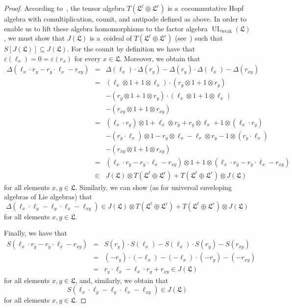 \documentclass{jonasart}
\DeclareMathOperator{\UL}{UL}
\DeclareMathOperator{\weak}{weak}
\newcommand{\lf}{\mathfrak{L}}
\begin{document}
	\begin{proof}
		According to~\cite[Theorem III.2.4 and Example 3 on p.\ 56]{K}, the tensor algebra $T(\lf^\ell\oplus\lf^r )$ is a~cocommutative Hopf algebra with comultiplication, counit, and antipode defined as above. In order to enable us to lift these algebra homomorphisms to the factor algebra
		$\UL_{\weak}(\lf)$, we must show that $J(\lf)$ is a~coideal of $T(\lf^\ell
		\oplus\lf^r )$ (see~\cite[Definition~III.1.5]{K}) such that $S[J(\lf)]
		\subseteq J(\lf)$. For the counit by definition we have that $\varepsilon
		(\ell_x )=0=\varepsilon(r_x )$ for every $x\in\lf$. Moreover, we obtain that
		\begin{eqnarray*}
			\Delta(\ell_x\cdot r_y -r_y\cdot\ell_x -r_{xy}) & = & \Delta(\ell_x )\cdot
			\Delta(r_y )-\Delta(r_y )\cdot\Delta(\ell_x )-\Delta(r_{xy})\\
			& = & (\ell_x\otimes 1+1\otimes\ell_x )\cdot(r_y\otimes 1+1\otimes r_y )\\
			&& -(r_y\otimes 1+1\otimes r_y )\cdot(\ell_x\otimes 1+1\otimes\ell_x )\\
			&& -(r_{xy}\otimes 1+1\otimes r_{xy})\\
			& = & (\ell_x\cdot r_y )\otimes 1+\ell_x\otimes r_y +r_y\otimes\ell_x
			+1\otimes(\ell_x\cdot r_y )\\
			&& -(r_y\cdot\ell_x )\otimes 1-r_y\otimes\ell_x -\ell_x\otimes r_y -1
			\otimes(r_y\cdot\ell_x )\\
			&& -(r_{xy}\otimes 1+1\otimes r_{xy})\\
			& = & (\ell_x\cdot r_y -r_y\cdot\ell_x -r_{xy})\otimes 1+1\otimes
			(\ell_x\cdot r_y -r_y\cdot\ell_x - r_{xy})\\
			& \in & J(\lf)\otimes T(\lf^\ell\oplus\lf^r )+T(\lf^\ell\oplus\lf^r )\otimes J(\lf)
		\end{eqnarray*}
		for all elements $x,y\in\lf$. Similarly, we can show (as for universal enveloping algebras of Lie algebras) that
		\[
			\Delta(\ell_x\cdot\ell_y -\ell_y\cdot\ell_x -\ell_{xy})\in J(\lf)\otimes
			T(\lf^\ell\oplus\lf^r )+T(\lf^\ell\oplus\lf^r )\otimes J(\lf)
		\]
		for all elements $x,y\in\lf$.

		Finally, we have that
		\begin{eqnarray*}
			S(\ell_x\cdot r_y -r_y\cdot\ell_x -r_{xy}) & = & S(r_y )\cdot S(\ell_x )
			-S(\ell_x )\cdot S(r_y )-S(r_{xy})\\
			& = & (-r_y )\cdot(-\ell_x )-(-\ell_x )\cdot(-r_y )-(-r_{xy})\\
			& = & r_y\cdot\ell_x -\ell_x\cdot r_y +r_{xy}\in J(\lf)
		\end{eqnarray*}
		for all elements $x,y\in\lf$, and, similarly, we obtain that
		\[
			S(\ell_x\cdot\ell_y -\ell_y\cdot\ell_x -\ell_{xy})\in J(\lf)
		\]
		for all elements $x,y\in\lf$.
	\end{proof}
\end{document}
